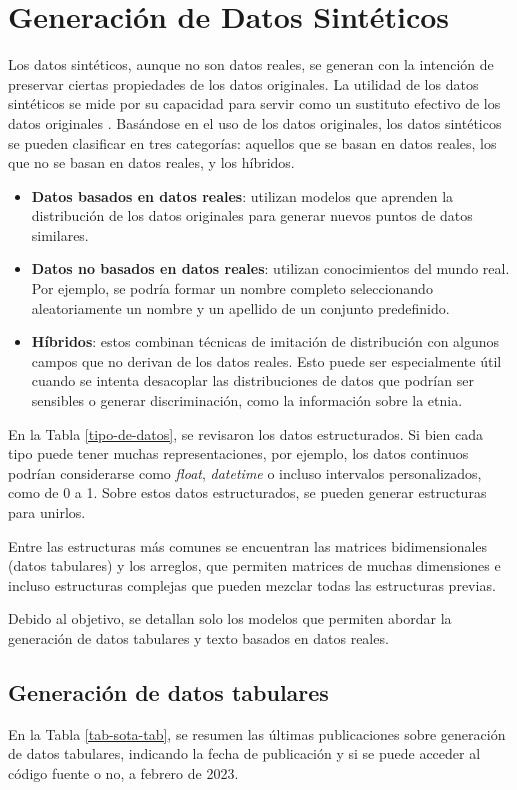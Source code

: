 \newpage
\section{Generación de Datos Sintéticos}

Los datos sintéticos, aunque no son datos reales, se generan con la intención de preservar ciertas propiedades de los datos originales. La utilidad de los datos sintéticos se mide por su capacidad para servir como un sustituto efectivo de los datos originales \cite{bruce_practical_2020}. Basándose en el uso de los datos originales, los datos sintéticos se pueden clasificar en tres categorías: aquellos que se basan en datos reales, los que no se basan en datos reales, y los híbridos.

\begin{itemize}
    \item \textbf{Datos basados en datos reales}: utilizan modelos que aprenden la distribución de los datos originales para generar nuevos puntos de datos similares.
    \item \textbf{Datos no basados en datos reales}: utilizan conocimientos del mundo real. Por ejemplo, se podría formar un nombre completo seleccionando aleatoriamente un nombre y un apellido de un conjunto predefinido.
    \item \textbf{Híbridos}: estos combinan técnicas de imitación de distribución con algunos campos que no derivan de los datos reales. Esto puede ser especialmente útil cuando se intenta desacoplar las distribuciones de datos que podrían ser sensibles o generar discriminación, como la información sobre la etnia.
\end{itemize}
    
En la Tabla \ref{tipo-de-datos}, se revisaron los datos estructurados. Si bien cada tipo puede tener muchas representaciones, por ejemplo, los datos continuos podrían considerarse como \emph{float}, \emph{datetime} o incluso intervalos personalizados, como de 0 a 1. Sobre estos datos estructurados, se pueden generar estructuras para unirlos.

Entre las estructuras más comunes se encuentran las matrices bidimensionales (datos tabulares) y los arreglos, que permiten matrices de muchas dimensiones e incluso estructuras complejas que pueden mezclar todas las estructuras previas.

Debido al objetivo, se detallan solo los modelos que permiten abordar la generación de datos tabulares y texto basados en datos reales.
\newpage
\subsection{Generación de datos tabulares}
En la Tabla \ref{tab-sota-tab}, se resumen las últimas publicaciones sobre generación de datos tabulares, indicando la fecha de publicación y si se puede acceder al código fuente o no, a febrero de 2023.

